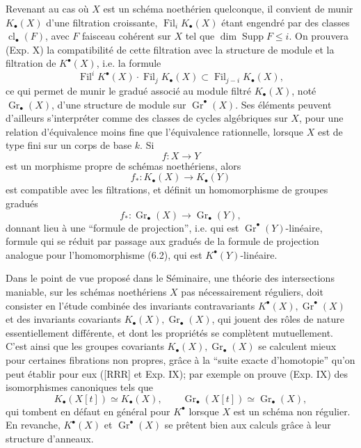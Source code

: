 \documentclass[11pt]{article}
\newcommand{\Gr}{\operatorname{Gr}}
\newcommand{\Fil}{\operatorname{Fil}}
\newcommand{\cl}{\operatorname{cl}}
\begin{document}
Revenant au cas o\`u $X$ est un sch\'ema noeth\'erien quelconque, il convient de munir $K_\bullet(X)$ d'une filtration croissante, $\Fil_iK_\bullet(X)$ \'etant engendr\'e par des classes $\cl_\bullet(F)$, avec $F$ faisceau coh\'erent sur $X$ tel que $\dim \operatorname{Supp}F\le i$. On prouvera (Exp. X) la compatibilit\'e de cette filtration avec la structure de module et la filtration de $K^\bullet(X)$, i.e. la formule
\begin{equation}\tag{6.1}
\Fil^iK^\bullet(X)\cdot \Fil_jK_\bullet(X)\subset \Fil_{j-i}K_\bullet(X),
\end{equation}
ce qui permet de munir le gradu\'e associ\'e au module filtr\'e $K_\bullet(X)$, not\'e $\Gr_\bullet(X)$, d'une structure de module sur $\Gr^\bullet(X)$. Ses \'el\'ements peuvent d'ailleurs s'interpr\'eter comme des classes de cycles alg\'ebriques sur $X$, pour une relation d'\'equivalence moins fine que l'\'equivalence rationnelle, lorsque $X$ est de type fini sur un corps de base $k$. Si
\[
f:X\longrightarrow Y
\]
est un morphisme propre de sch\'emas noeth\'eriens, alors
\begin{equation}\tag{6.2}
f_*:K_\bullet(X)\longrightarrow K_\bullet(Y)
\end{equation}
est compatible avec les filtrations, et d\'efinit un homomorphisme de groupes gradu\'es
\begin{equation}\tag{6.3}
f_*:\Gr_\bullet(X)\longrightarrow \Gr_\bullet(Y),
\end{equation}
donnant lieu \`a une ``formule de projection'', i.e. qui est $\Gr^\bullet(Y)$-lin\'eaire, formule qui se r\'eduit par passage aux gradu\'es de la formule de projection analogue pour l'homomorphisme (6.2), qui est $K^\bullet(Y)$-lin\'eaire.

Dans le point de vue propos\'e dans le S\'eminaire, une th\'eorie des intersections maniable, sur les sch\'emas noeth\'eriens $X$ pas n\'ecessairement r\'eguliers, doit consister en l'\'etude combin\'ee des invariants contravariants $K^\bullet(X),\Gr^\bullet(X)$ et des invariants covariants $K_\bullet(X),\Gr_\bullet(X)$, qui jouent des r\^oles de nature essentiellement diff\'erente, et dont les propri\'et\'es se compl\`etent mutuellement. C'est ainsi que les groupes covariants $K_\bullet(X),\Gr_\bullet(X)$ se calculent mieux pour certaines fibrations non propres, gr\^ace \`a la ``suite exacte d'homotopie'' qu'on peut \'etablir pour eux ([RRR] et Exp. IX); par exemple on prouve (Exp. IX) des isomorphismes canoniques tels que
\[
K_\bullet(X[t])\simeq K_\bullet(X),\qquad \Gr_\bullet(X[t])\simeq \Gr_\bullet(X),
\]
qui tombent en d\'efaut en g\'en\'eral pour $K^\bullet$ lorsque $X$ est un sch\'ema non r\'egulier. En revanche, $K^\bullet(X)$ et $\Gr^\bullet(X)$ se pr\^etent bien aux calculs gr\^ace \`a leur structure d'anneaux.
\end{document}
